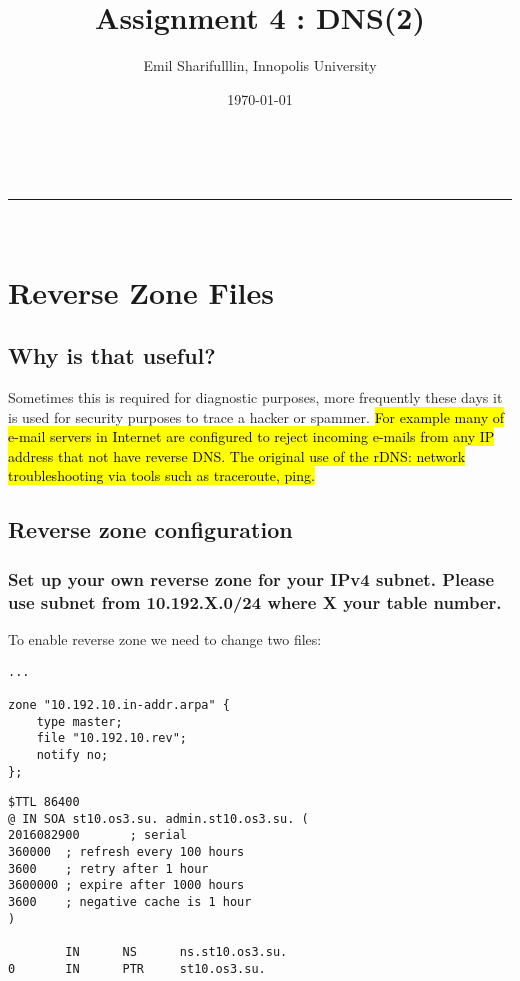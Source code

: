 \documentclass[a4paper,11pt]{article}
\makeatletter
\newcommand*{\TitleFont}{%
      \usefont{\encodingdefault}{\rmdefault}{b}{n}%
      \fontsize{16}{20}%
      \selectfont}
\renewcommand{\maketitle}{
\begin{center}
\vspace{2ex}
{\huge \textsc{\@title}}
\vspace{1ex}
\\
\rule{\linewidth}{0.5pt}\\
\@author \hfill \@date
\vspace{4ex}
\end{center}
}
\makeatother
\begin{document}



\title{ \TitleFont Assignment 4 : DNS(2) }

\author{Emil Sharifulllin, Innopolis University}

\date{\today}

\maketitle

\section{Reverse Zone Files}


\subsection{Why is that useful?}
Sometimes this is required for diagnostic purposes, more frequently these days it is used for security purposes to trace a hacker or spammer. \hl{For example many of e-mail servers in Internet are configured to reject incoming e-mails from any IP address that not have reverse DNS. The original use of the rDNS: network troubleshooting via tools such as traceroute, ping.}

\subsection{Reverse zone configuration}

\subsubsection{Set up your own reverse zone for your IPv4 subnet. Please use subnet from
10.192.X.0/24 where X your table number.}

To enable reverse zone we need to change two files:

\begin{lstlisting}[caption=/etc/named.conf]
...

zone "10.192.10.in-addr.arpa" {
    type master;
    file "10.192.10.rev";
    notify no;
};
\end{lstlisting}

\begin{lstlisting}[caption=10.192.10.rev]
$TTL 86400
@ IN SOA st10.os3.su. admin.st10.os3.su. (
2016082900       ; serial
360000  ; refresh every 100 hours
3600    ; retry after 1 hour
3600000 ; expire after 1000 hours
3600    ; negative cache is 1 hour
)

        IN      NS      ns.st10.os3.su.
0       IN      PTR     st10.os3.su.

\end{lstlisting}
\end{document}
